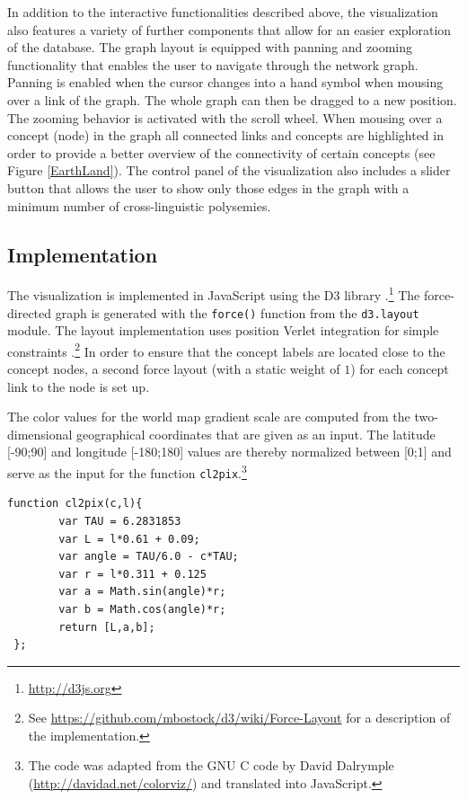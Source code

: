 In addition to the interactive functionalities described above, the visualization also features a variety of further components that allow for an easier exploration of the database. The graph layout is equipped with panning and zooming functionality that enables the user to navigate through the network graph. Panning is enabled when the cursor changes into a hand symbol when mousing over a link of the graph. The whole graph can then be dragged to a new position. The zooming behavior is activated with the scroll wheel. 
When mousing over a concept (node) in the graph all connected links and concepts are highlighted
in order to provide a better overview of the connectivity of certain concepts (see Figure \ref{EarthLand}). The control panel of the visualization also includes a slider button that allows the user to show only those edges in the graph with a minimum number of cross-linguistic polysemies. 




\subsection{Implementation}

The visualization is implemented in JavaScript using the D3 library \cite{D3}.\footnote{\url{http://d3js.org}} The force-directed graph is  generated with the \texttt{force()} function from the \texttt{d3.layout} module. The layout implementation uses position Verlet integration for simple constraints \cite{Dwyer2009}.\footnote{See \url{https://github.com/mbostock/d3/wiki/Force-Layout} for a description of the implementation.} In order to ensure that the concept labels are located close to the concept nodes, a second force layout (with a static weight of $1$) for each concept link to the node is set up. 

The color values for the world map gradient scale are computed from the two-dimensional geographical coordinates that are given as an input. The latitude [-90;90] and longitude [-180;180] values are thereby normalized between [0;1] and serve as the input for the function \texttt{cl2pix}.\footnote{The code was adapted from the GNU C code by David Dalrymple (\url{http://davidad.net/colorviz/}) and translated into JavaScript.}

\begin{verbatim}
function cl2pix(c,l){
   		var TAU = 6.2831853 
   		var L = l*0.61 + 0.09; 
   		var angle = TAU/6.0 - c*TAU;   
   		var r = l*0.311 + 0.125 
   		var a = Math.sin(angle)*r;
   		var b = Math.cos(angle)*r;
   		return [L,a,b];
 };
\end{verbatim}

